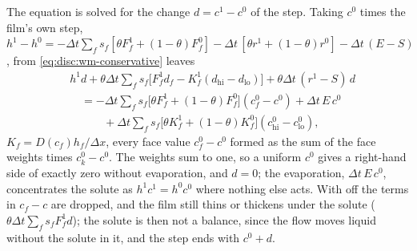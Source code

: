 The equation is solved for the change $d = c^{1} - c^{0}$ of the step. Taking
$c^{0}$ times the film's own step,
$h^{1} - h^{0} = -\Delta t \sum_f s_f[\theta F_f^{1} + (1-\theta)F_f^{0}]
- \Delta t\,[\theta r^{1} + (1-\theta)r^{0}] - \Delta t\,(E - S)$, from
\cref{eq:disc:wm-conservative} leaves
%
\begin{equation}\label{eq:disc:wm-change}
  \begin{aligned}
    &h^{1} d + \theta\Delta t \sum_f s_f\bigl[F_f^{1} d_f - K_f^{1}(d_{\mathrm{hi}} - d_{\mathrm{lo}})\bigr]
       + \theta\Delta t\,(r^{1} - S)\,d \\
    &\quad= -\Delta t \sum_f s_f \bigl[\theta F_f^{1} + (1-\theta)F_f^{0}\bigr](c^{0}_f - c^{0})
       + \Delta t\,E\,c^{0} \\
    &\qquad\quad{}+ \Delta t \sum_f s_f \bigl[\theta K_f^{1} + (1-\theta)K_f^{0}\bigr](c^{0}_{\mathrm{hi}} - c^{0}_{\mathrm{lo}}),
  \end{aligned}
\end{equation}
%
$K_f = D(c_f)h_f/\Delta x$, every face value $c^{0}_f - c^{0}$ formed as the
sum of the face weights times $c^{0}_k - c^{0}$. The weights sum to one, so a
uniform $c^{0}$ gives a right-hand side of exactly zero without evaporation,
and $d = 0$; the evaporation, $\Delta t\,E\,c^{0}$, concentrates the solute
as $h^{1}c^{1} = h^{0}c^{0}$ where nothing else acts. With
 off the terms in $c_f - c$ are dropped, and the film
still thins or thickens under the solute ($\theta\Delta t \sum_f s_f
F_f^{1} d$); the solute is then not a balance, since the flow moves liquid
without the solute in it, and the step ends with $c^{0} + d$.

